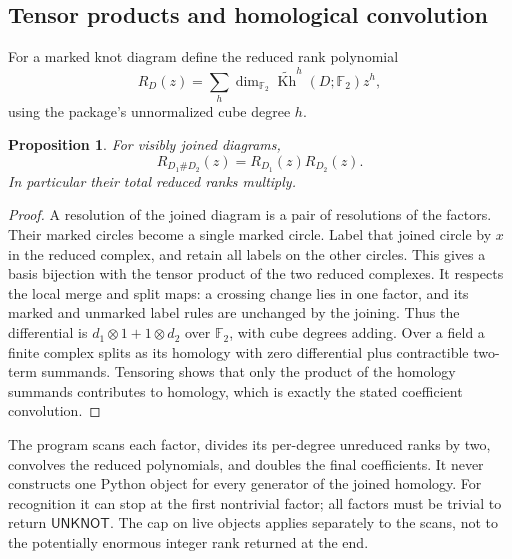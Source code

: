 \documentclass[11pt]{article}
\newtheorem{proposition}[theorem]{Proposition}
\theoremstyle{definition}\newtheorem{definition}[theorem]{Definition}
\theoremstyle{remark}\newtheorem{remark}[theorem]{Remark}
\newcommand{\F}{\mathbb F_2}
\newcommand{\rKh}{\widetilde{\operatorname{Kh}}}
\newcommand{\unk}{\textsf{UNKNOT}}
\begin{document}
\subsection{Tensor products and homological convolution}
For a marked knot diagram define the reduced rank polynomial
\[
 R_D(z)=\sum_h\dim_{\F}\rKh^h(D;\F)z^h,
\]
using the package's unnormalized cube degree $h$.

\begin{proposition}\label{prop:product}
For visibly joined diagrams,
\[
 R_{D_1\#D_2}(z)=R_{D_1}(z)R_{D_2}(z).
\]
In particular their total reduced ranks multiply.
\end{proposition}
\begin{proof}
A resolution of the joined diagram is a pair of resolutions of the factors.
Their marked circles become a single marked circle. Label that joined circle
by $x$ in the reduced complex, and retain all labels on the other circles.
This gives a basis bijection with the tensor product of the two reduced
complexes. It respects the local merge and split maps: a crossing change lies
in one factor, and its marked and unmarked label rules are unchanged by the
joining. Thus the differential is $d_1\otimes1+1\otimes d_2$ over $\F$,
with cube degrees adding. Over a field a finite complex splits as its homology
with zero differential plus contractible two-term summands. Tensoring shows
that only the product of the homology summands contributes to homology, which
is exactly the stated coefficient convolution.
\end{proof}
The program scans each factor, divides its per-degree unreduced ranks by two,
convolves the reduced polynomials, and doubles the final coefficients. It never
constructs one Python object for every generator of the joined homology. For
recognition it can stop at the first nontrivial factor; all factors must be
trivial to return $\unk$. The cap on live objects applies separately to the
scans, not to the potentially enormous integer rank returned at the end.
\end{document}
